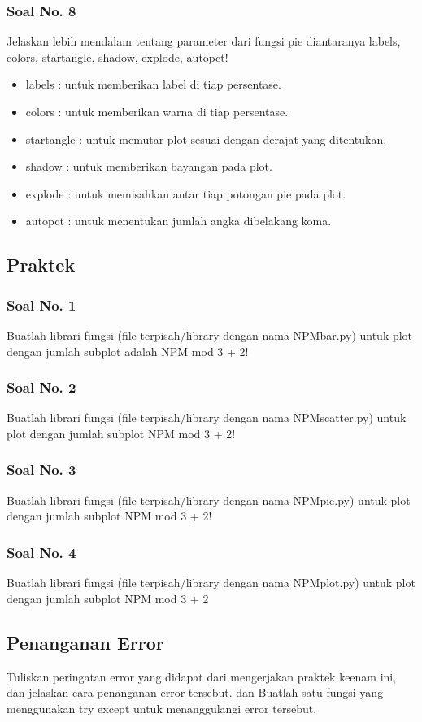 \subsubsection{Soal No. 8}
\hfill \break
 Jelaskan lebih mendalam tentang parameter dari fungsi pie diantaranya labels, colors, startangle, shadow, explode, autopct!
 
 \begin{itemize}
 	\item labels : untuk memberikan label di tiap persentase.
 	\item colors : untuk memberikan warna di tiap persentase.
 	\item startangle : untuk memutar plot sesuai dengan derajat yang ditentukan.
 	\item shadow : untuk memberikan bayangan pada plot.
 	\item explode : untuk memisahkan antar tiap potongan pie pada plot.
 	\item autopct : untuk menentukan jumlah angka dibelakang koma.
 \end{itemize}

\subsection{Praktek}
\subsubsection{Soal No. 1}
\hfill \break
Buatlah librari fungsi (file terpisah/library dengan nama NPMbar.py) untuk plot dengan jumlah subplot adalah NPM mod 3 + 2!

\subsubsection{Soal No. 2}
\hfill \break
Buatlah librari fungsi (file terpisah/library dengan nama NPMscatter.py) untuk plot dengan jumlah subplot NPM mod 3 + 2!

\subsubsection{Soal No. 3}
\hfill \break
Buatlah librari fungsi (file terpisah/library dengan nama NPMpie.py) untuk plot dengan jumlah subplot NPM mod 3 + 2!

\subsubsection{Soal No. 4}
\hfill \break
Buatlah librari fungsi (file terpisah/library dengan nama NPMplot.py) untuk plot dengan jumlah subplot NPM mod 3 + 2


\subsection{Penanganan Error}
Tuliskan  peringatan  error  yang  didapat  dari  mengerjakan  praktek  keenam  ini, dan  jelaskan  cara  penanganan  error  tersebut. dan  Buatlah  satu  fungsi  yang menggunakan try except untuk menanggulangi error tersebut.
